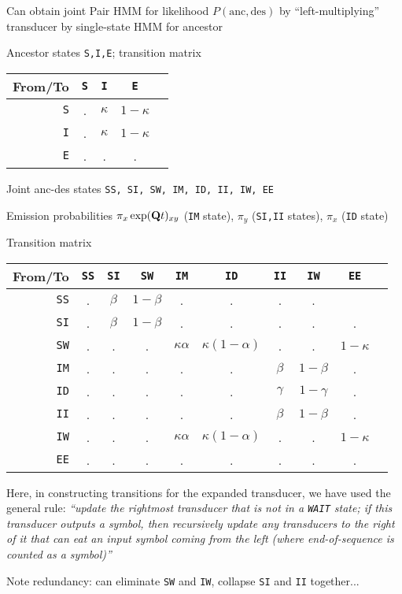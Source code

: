 \documentclass{beamer}
\begin{document}
\begin{frame}{}
Can obtain joint Pair HMM for likelihood $P(\mbox{anc},\mbox{des})$ by ``left-multiplying'' transducer by single-state HMM for ancestor
  \itemb
  \item Ancestor states {\tt S,I,E}; transition matrix
\begin{tabular}{r|cccc}
From/To & {\tt S} & {\tt I} & {\tt E} \\
\hline
{\tt S} & . & $\kappa$ & $1-\kappa$ \\
{\tt I} & . & $\kappa$ & $1-\kappa$ \\
{\tt E} & . & . & .
\end{tabular}
  \item Joint anc-des states {\tt SS, SI, SW, IM, ID, II, IW, EE}
  \item Emission probabilities $\pi_x \exp({\bf Q}t)_{xy}$ ({\tt IM} state), $\pi_y$ ({\tt SI,II} states), $\pi_x$ ({\tt ID} state)
  \item Transition matrix
\begin{tabular}{r|ccccccccc}
From/To & {\tt SS} & {\tt SI} & {\tt SW} & {\tt IM} & {\tt ID} & {\tt II} & {\tt IW} & {\tt EE} \\
\hline
{\tt SS} & . & $\beta$ & $1-\beta$ & . & . & . & . \\
{\tt SI} & . & $\beta$ & $1-\beta$ & . & . & . & . & . \\
{\tt SW} & . & . & . & $\kappa\alpha$ & $\kappa(1-\alpha)$ & . & . & $1-\kappa$ \\
{\tt IM} & . & . & . & . & . & $\beta$ & $1-\beta$ & . \\
{\tt ID} & . & . & . & . & . & $\gamma$ & $1-\gamma$ & . \\
{\tt II} & . & . & . & . & . & $\beta$ & $1-\beta$ & . \\
{\tt IW} & . & . & . & $\kappa\alpha$ & $\kappa(1-\alpha)$ & . & . & $1-\kappa$ \\
{\tt EE} & . & . & . & . & . & . & . & .
\end{tabular}
  \item Here, in constructing transitions for the expanded transducer, we have used the general rule:
{\em``update the rightmost transducer that is not in a {\tt WAIT} state; if this transducer outputs a symbol,
   then recursively update any transducers to the right of it that can eat an input symbol coming from the left
   (where end-of-sequence is counted as a symbol)''}
  \item Note redundancy: can eliminate {\tt SW} and {\tt IW}, collapse {\tt SI} and {\tt II} together...
  \iteme
\end{frame}
\end{document}
